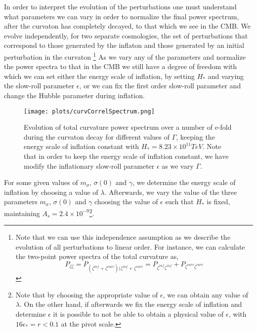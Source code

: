 \documentclass[11pt]{article}
\begin{document}
\indent In order to interpret the evolution of the perturbations one must understand what parameters we can vary in order to normalize the final power spectrum, after the curvaton has completely decayed, to that which we see in the CMB. We evolve independently, for two separate cosmologies, the set of perturbations that correspond to those generated by the inflaton and those generated by an initial perturbation in the curvaton \footnote{Note that we can use this independence assumption as we describe the evolution of all perturbations to linear order. For instance, we can calculate the two-point power spectra of the total curvature as, 
\begin{equation}
P_{\zeta \zeta} = P_{(\zeta^{inf} + \zeta^{curv}) (\zeta^{inf} + \zeta^{curv}} = P_{\zeta^{inf} \zeta^{inf}} + P_{ \zeta^{curv} \zeta^{curv}}
\end{equation} }
As we vary any of the parameters and normalize the power spectra to that in the CMB we still have a degree of freedom with which we can set either the energy scale of inflation, by setting $H_*$ and varying the slow-roll parameter $\epsilon$, or we can fix the first order slow-roll parameter and change the Hubble parameter during inflation.  \\
\indent 
\begin{figure}

\centering
\texttt{[image: plots/curvCorrelSpectrum.png]}
\caption{Evolution of total curvature power spectrum over a number of e-fold during the curvaton decay for different values of $\Gamma$, keeping the energy scale of inflation constant with $H_* = 8.23 \times 10^{11} TeV$. Note that in order to keep the energy scale of inflation constant, we have modify the inflationary slow-roll parameter $\epsilon$ as we vary $\Gamma$. }
\label{fig:powerspectra}
\end{figure}
\indent For some given values of $m_{\sigma}$, $\sigma(0)$ and $\gamma$, we determine the energy scale of inflation by choosing a value of $\lambda $. Afterwards, we vary the value of the three parameters  $m_{\sigma}$, $\sigma(0)$ and $\gamma$ choosing the value of $\epsilon$ such that $H_*$ is fixed, maintaining $A_s = 2.4 \times 10^{-9}$\footnote{Note that by choosing the appropriate value of $\epsilon$, we can obtain any value of $\lambda$. On the other hand, if afterwards we fix the energy scale of inflation and determine $\epsilon$ it is possible to not be able to obtain a physical value of $\epsilon$, with $16\epsilon_* = r < 0.1$ at the pivot scale. }. \\
\end{document}
